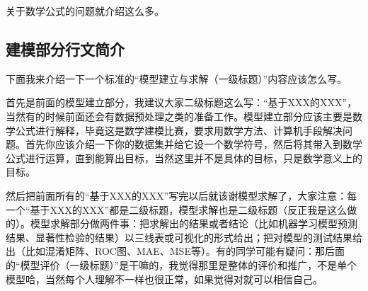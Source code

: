 关于数学公式的问题就介绍这么多。




\subsection{建模部分行文简介}


下面我来介绍一下一个标准的“模型建立与求解（一级标题）”内容应该怎么写。

首先是前面的模型建立部分，我建议大家二级标题这么写：“基于XXX的XXX”，当然有的时候前面还会有数据预处理之类的准备工作。模型建立部分应该主要是数学公式进行解释，毕竟这是数学建模比赛，要求用数学方法、计算机手段解决问题。首先你应该介绍一下你的数据集并给它设一个数学符号，然后将其带入到数学公式进行运算，直到能算出目标，当然这里并不是具体的目标，只是数学意义上的目标。

然后把前面所有的“基于XXX的XXX”写完以后就该谢模型求解了，大家注意：每一个“基于XXX的XXX”都是二级标题，模型求解也是二级标题（反正我是这么做的）。模型求解部分做两件事：把求解出的结果或者结论（比如机器学习模型预测结果、显著性检验的结果）以三线表或可视化的形式给出；把对模型的测试结果给出（比如混淆矩阵、ROC图、MAE、MSE等）。有的同学可能有疑问：那后面的“模型评价（一级标题）”是干嘛的，我觉得那里是整体的评价和推广，不是单个模型哈，当然每个人理解不一样也很正常，如果觉得对就可以相信自己。








